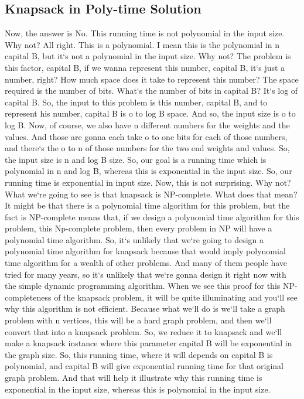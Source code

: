 \subsection{Knapsack in Poly-time Solution}
Now, the answer is No.
This running time is not polynomial in the input size.
Why not? All right.
This is a polynomial.
I mean this is the polynomial in n capital B, but it`s not a polynomial in the input size.
Why not? The problem is this factor, capital B, if we wanna represent this number, capital B, it`s just a number, right? How much space does it take to represent this number? The space required is the number of bits.
What`s the number of bits in capital B? It`s log of capital B\@.
So, the input to this problem is this number, capital B, and to represent his number, capital B is o to log B space.
And so, the input size is o to log B\@.
Now, of course, we also have n different numbers for the weights and the values.
And those are gonna each take o to one bits for each of those numbers, and there`s the o to n of those numbers for the two end weights and values.
So, the input size is n and log B size.
So, our goal is a running time which is polynomial in n and log B, whereas this is exponential in the input size.
So, our running time is exponential in input size.
Now, this is not surprising.
Why not? What we`re going to see is that knapsack is NP-complete.
What does that mean? It might be that there is a polynomial time algorithm for this problem, but the fact is NP-complete means that, if we design a polynomial time algorithm for this problem, this Np-complete problem, then every problem in NP will have a polynomial time algorithm.
So, it`s unlikely that we`re going to design a polynomial time algorithm for knapsack because that would imply polynomial time algorithm for a wealth of other problems.
And many of them people have tried for many years, so it`s unlikely that we`re gonna design it right now with the simple dynamic programming algorithm.
When we see this proof for this NP-completeness of the knapsack problem, it will be quite illuminating and you`ll see why this algorithm is not efficient.
Because what we`ll do is we`ll take a graph problem with n vertices, this will be a hard graph problem, and then we`ll convert that into a knapsack problem.
So, we reduce it to knapsack and we`ll make a knapsack instance where this parameter capital B will be exponential in the graph size.
So, this running time, where it will depends on capital B is polynomial, and capital B will give exponential running time for that original graph problem.
And that will help it illustrate why this running time is exponential in the input size, whereas this is polynomial in the input size.

